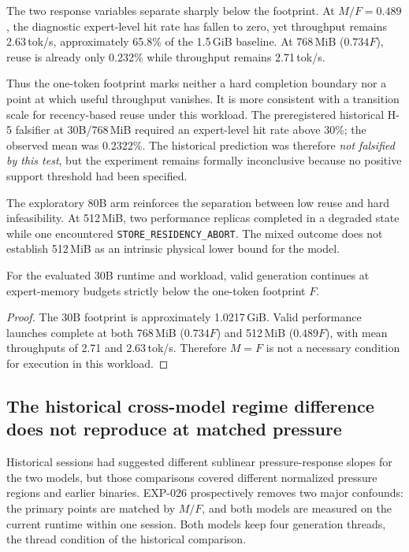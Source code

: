 The two response variables separate sharply below the footprint. At $M/F=0.489$, the diagnostic expert-level hit rate has fallen to zero, yet throughput remains 2.63\,tok/s, approximately 65.8\% of the 1.5\,GiB baseline. At 768\,MiB ($0.734F$), reuse is already only 0.232\% while throughput remains 2.71\,tok/s.

Thus the one-token footprint marks neither a hard completion boundary nor a point at which useful throughput vanishes. It is more consistent with a transition scale for recency-based reuse under this workload. The preregistered historical H-5 falsifier at 30B/768\,MiB required an expert-level hit rate above 30\%; the observed mean was 0.2322\%. The historical prediction was therefore \emph{not falsified by this test}, but the experiment remains formally inconclusive because no positive support threshold had been specified.

The exploratory 80B arm reinforces the separation between low reuse and hard infeasibility. At 512\,MiB, two performance replicas completed in a degraded state while one encountered \nolinkurl{STORE_RESIDENCY_ABORT}. The mixed outcome does not establish 512\,MiB as an intrinsic physical lower bound for the model.

\begin{proposition}
\label{prop:not-hard-threshold}
For the evaluated 30B runtime and workload, valid generation continues at expert-memory budgets strictly below the one-token footprint $F$.
\end{proposition}

\begin{proof}
The 30B footprint is approximately 1.0217\,GiB. Valid performance launches complete at both 768\,MiB ($0.734F$) and 512\,MiB ($0.489F$), with mean throughputs of 2.71 and 2.63\,tok/s. Therefore $M=F$ is not a necessary condition for execution in this workload.
\end{proof}

\subsection{The historical cross-model regime difference does not reproduce at matched pressure}

Historical sessions had suggested different sublinear pressure-response slopes for the two models, but those comparisons covered different normalized pressure regions and earlier binaries. EXP-026 prospectively removes two major confounds: the primary points are matched by $M/F$, and both models are measured on the current runtime within one session. Both models keep four generation threads, the thread condition of the historical comparison.

